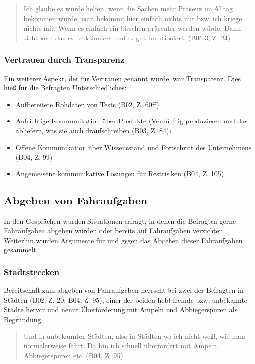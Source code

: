 \documentclass[12pt]{article}
\begin{document}
\begin{quote}
  Ich glaube es würde helfen, wenn die Sachen mehr Präsenz im Alltag bekommen würde, man bekommt hier einfach nichts mit bzw. ich kriege nichts mit. Wenn es einfach ein bisschen präsenter werden würde. Dann sieht man das es funktioniert und es gut funktioniert. (B06.3, Z. 24)
\end{quote}

\subsubsection*{Vertrauen durch Transparenz}
Ein weiterer Aspekt, der für Vertrauen genannt wurde, war Transparenz. Dies hieß für die Befragten Unterschiedliches:
\begin{itemize}
  \item Aufbereitete Rohdaten von Tests (B02, Z. 60ff)
  \item Aufrichtige Kommunikation über Produkte (\glqq Vernünftig produzieren und das abliefern, was sie auch draufschreiben\grqq{} (B03, Z. 84))
  \item Offene Kommunikation über Wissensstand und Fortschritt des Unternehmens (B04, Z. 99)
  \item Angemessene kommunikative Lösungen für Restrisiken (B04, Z. 105)
\end{itemize}

\subsection{Abgeben von Fahraufgaben}
In den Gesprächen wurden Situationen erfragt, in denen die Befragten gerne Fahraufgaben abgeben würden oder bereits auf Fahraufgaben verzichten. Weiterhin wurden Argumente für und gegen das Abgeben dieser Fahraufgaben gesammelt.

\subsubsection*{Stadtstrecken}
Bereitschaft zum abgeben von Fahraufgaben herrscht bei zwei der Befragten in Städten (B02, Z. 20; B04, Z. 95), einer der beiden hebt fremde bzw. unbekannte Städte hervor und nennt Überforderung mit Ampeln und Abbiegerspuren als Begründung.

\begin{quote}
  Und in unbekannten Städten, also in Städten wo ich nicht weiß, wie man normalerweise fährt. Da bin ich schnell überfordert mit Ampeln, Abbiegerspuren etc. (B04, Z. 95)
\end{quote}
\end{document}
